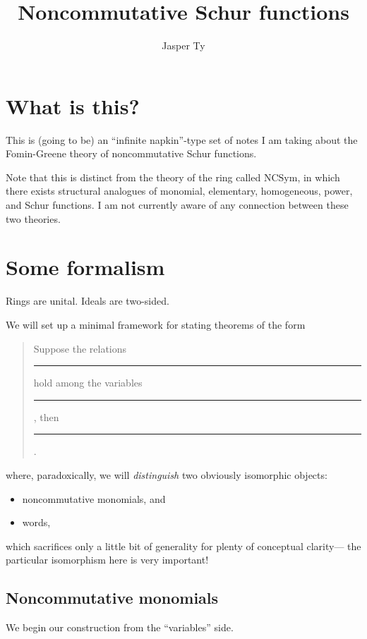 \documentclass{article}
\title{Noncommutative Schur functions}
\author{Jasper Ty}
\date{}
\begin{document}
\maketitle

\section*{What is this?}

This is (going to be) an ``infinite napkin''-type set of notes I am taking about the Fomin-Greene theory of noncommutative Schur functions.

Note that this is distinct from the theory of the ring called $\mathrm{NCSym}$, in which there exists structural analogues of monomial, elementary, homogeneous, power, and Schur functions.
I am not currently aware of any connection between these two theories.

\tableofcontents

\newpage

\section{Some formalism}

\begin{convention}
    Rings are unital.
    Ideals are two-sided.
\end{convention}

We will set up a minimal framework for stating theorems of the form
\begin{quote}
    Suppose the relations \rule{1cm}{0.15mm} hold among the variables \rule{1cm}{0.15mm}, then \rule{1cm}{0.15mm}.
\end{quote}
where, paradoxically, we will \textit{distinguish} two obviously isomorphic objects:
\begin{itemize}
    \item
        noncommutative monomials, and
    \item
        words,
\end{itemize}
which sacrifices only a little bit of generality for plenty of conceptual clarity--- the particular isomorphism here is very important!

\subsection{Noncommutative monomials}

We begin our construction from the ``variables'' side.
\end{document}
